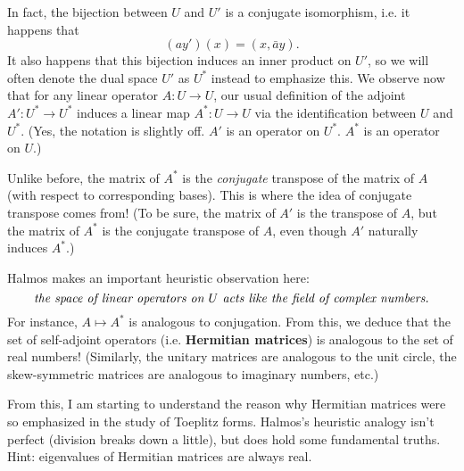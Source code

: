 \documentclass[12pt, a4paper]{article}
\begin{document}
In fact, the bijection between $U$ and $U'$ is a conjugate isomorphism, i.e. it happens that
\[
    (ay')(x) = (x, \bar{a}y).
\]
It also happens that this bijection induces an inner product on $U'$, so we will often denote the dual space $U'$ as $U^*$ instead to emphasize this. We observe now that for any linear operator $A: U \rightarrow U$, our usual definition of the adjoint $A': U^*\rightarrow U^*$ induces a linear map $A^*: U \rightarrow U$ via the identification between $U$ and $U^*$. (Yes, the notation is slightly off. $A'$ is an operator on $U^*$. $A^*$ is an operator on $U$.)

Unlike before, the matrix of $A^*$ is the \textit{conjugate} transpose of the matrix of $A$ (with respect to corresponding bases). This is where the idea of conjugate transpose comes from! (To be sure, the matrix of $A'$ is the transpose of $A$, but the matrix of $A^*$ is the conjugate transpose of $A$, even though $A'$ naturally induces $A^*$.)

Halmos makes an important heuristic observation here: 
\[
    \text{\textit{the space of linear operators on $U$ acts like the field of complex numbers.}}
\]
For instance, $A \mapsto A^*$ is analogous to conjugation. From this, we deduce that the set of self-adjoint operators (i.e. \textbf{Hermitian matrices}) is analogous to the set of real numbers! (Similarly, the unitary matrices are analogous to the unit circle, the skew-symmetric matrices are analogous to imaginary numbers, etc.)

From this, I am starting to understand the reason why Hermitian matrices were so emphasized in the study of Toeplitz forms. Halmos's heuristic analogy isn't perfect (division breaks down a little), but does hold some fundamental truths. Hint: eigenvalues of Hermitian matrices are always real.
\end{document}
